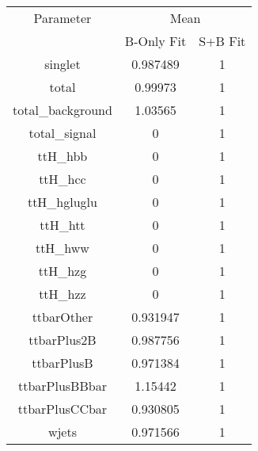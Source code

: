 \begin{table}
\centering

\begin{tabular}{ccc}
\toprule
Parameter & \multicolumn{2}{c}{Mean}\\
 & B-Only Fit & S+B Fit\\
\midrule
singlet & \num{0.987489} & \num{1}\\
total & \num{0.99973} & \num{1}\\
total\_background & \num{1.03565} & \num{1}\\
total\_signal & \num{0} & \num{1}\\
ttH\_hbb & \num{0} & \num{1}\\
ttH\_hcc & \num{0} & \num{1}\\
ttH\_hgluglu & \num{0} & \num{1}\\
ttH\_htt & \num{0} & \num{1}\\
ttH\_hww & \num{0} & \num{1}\\
ttH\_hzg & \num{0} & \num{1}\\
ttH\_hzz & \num{0} & \num{1}\\
ttbarOther & \num{0.931947} & \num{1}\\
ttbarPlus2B & \num{0.987756} & \num{1}\\
ttbarPlusB & \num{0.971384} & \num{1}\\
ttbarPlusBBbar & \num{1.15442} & \num{1}\\
ttbarPlusCCbar & \num{0.930805} & \num{1}\\
wjets & \num{0.971566} & \num{1}\\
\bottomrule
\end{tabular}
\end{table}